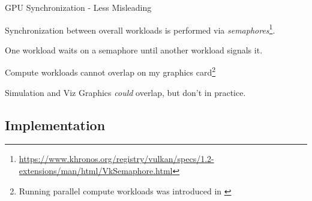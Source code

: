 \begin{frame}{GPU Synchronization - Less Misleading}
{\begin{tikzpicture}[
            scale=0.9, every node/.style={scale=0.9},
        fixedrect/.style={rectangle,draw,minimum height=4em,anchor=west,text width=2cm,align=center},
        ]

        \end{tikzpicture}
    }

    \vfill\null
    
    \begin{wideitemize}
        \item Synchronization between overall workloads is performed via \emph{semaphores}\footnote{\url{https://www.khronos.org/registry/vulkan/specs/1.2-extensions/man/html/VkSemaphore.html}}.
        \item One workload waits on a semaphore until another workload signals it.
        \item Compute workloads cannot overlap on my graphics card\footnote{Running parallel compute workloads was introduced in \parencite{nvidiaAmpereWhitepaper}}
        \item Simulation and Viz Graphics \emph{could} overlap, but don't in practice.
    \end{wideitemize}
\end{frame}

\subsection{Implementation}

